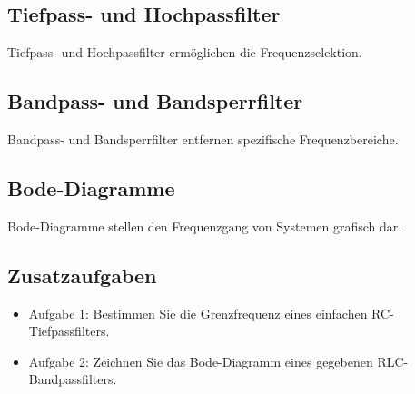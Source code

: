 \documentclass[11pt,a4paper]{article}
\begin{document}

\subsection{Tiefpass- und Hochpassfilter}
Tiefpass- und Hochpassfilter ermöglichen die Frequenzselektion.

\subsection{Bandpass- und Bandsperrfilter}
Bandpass- und Bandsperrfilter entfernen spezifische Frequenzbereiche.

\subsection{Bode-Diagramme}
Bode-Diagramme stellen den Frequenzgang von Systemen grafisch dar.

\subsection{Zusatzaufgaben}
\begin{itemize}
	\item Aufgabe 1: Bestimmen Sie die Grenzfrequenz eines einfachen RC-Tiefpassfilters.
	\item Aufgabe 2: Zeichnen Sie das Bode-Diagramm eines gegebenen RLC-Bandpassfilters.
\end{itemize}
\end{document}
